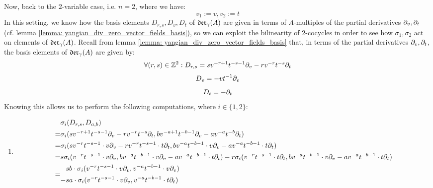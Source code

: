 \begin{example}
            Now, back to the $2$-variable case, i.e. $n = 2$, where we have:
                $$v_1 := v, v_2 := t$$
            In this setting, we know how the basis elements $D_{r, s}, D_v, D_t$ of $\divzero$ are given in terms of $A$-multiples of the partial derivatives $\del_v, \del_t$ (cf. lemma \ref{lemma: yangian_div_zero_vector_fields_basis}), so we can exploit the bilinearity of $2$-cocycles in order to see how $\sigma_1, \sigma_2$ act on elements of $\divzero$. Recall from lemma \ref{lemma: yangian_div_zero_vector_fields_basis} that, in terms of the partial derivatives $\del_v, \del_t$, the basis elements of $\divzero$ are given by:
                $$\forall (r, s) \in \Z^2: D_{r, s} = s v^{-r + 1} t^{-s - 1} \del_v - r v^{-r} t^{-s} \del_t$$
                $$D_v = -v t^{-1} \del_v$$
                $$D_t = -\del_t$$
            Knowing this allows us to perform the following computations, where $i \in \{1, 2\}$:
            \begin{enumerate}
                \item 
                    $$
                        \begin{aligned}
                            & \sigma_i(D_{r, s}, D_{a, b})
                            \\
                            = & \sigma_i( s v^{-r + 1} t^{-s - 1} \del_v - r v^{-r} t^{-s} \del_t, b v^{-a + 1} t^{-b - 1} \del_v - a v^{-a} t^{-b} \del_t )
                            \\
                            = & \sigma_i( s v^{-r} t^{-s - 1} \cdot v\del_v - r v^{-r} t^{-s - 1} \cdot t \del_t, b v^{-a} t^{-b - 1} \cdot v\del_v - a v^{-a} t^{-b - 1} \cdot t \del_t )
                            \\
                            = & s \sigma_i( v^{-r} t^{-s - 1} \cdot v\del_v, b v^{-a} t^{-b - 1} \cdot v\del_v - a v^{-a} t^{-b - 1} \cdot t \del_t ) - r \sigma_i( v^{-r} t^{-s - 1} \cdot t \del_t, b v^{-a} t^{-b - 1} \cdot v\del_v - a v^{-a} t^{-b - 1} \cdot t \del_t )
                            \\
                            = &
                            \begin{aligned}
                                & s b \cdot \sigma_i( v^{-r} t^{-s - 1} \cdot v\del_v, v^{-a} t^{-b - 1} \cdot v\del_v )
                                \\
                                - & s a \cdot \sigma_i( v^{-r} t^{-s - 1} \cdot v\del_v, v^{-a} t^{-b - 1} \cdot t \del_t )
                                \\

\end{aligned}
\end{aligned}$$
\end{enumerate}
\end{example}
